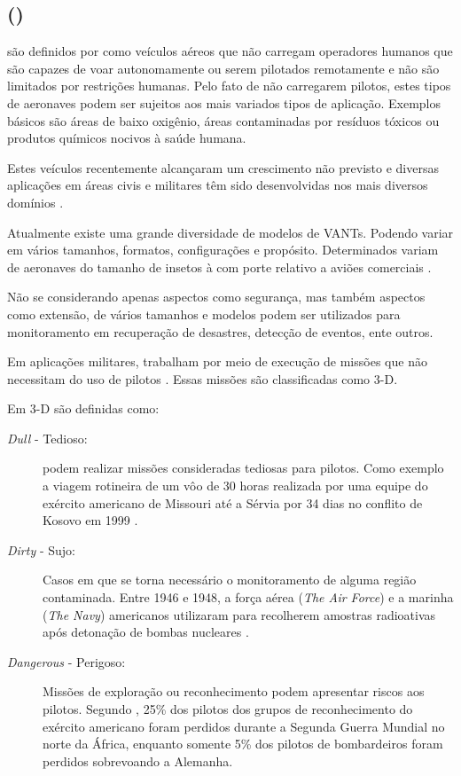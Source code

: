 \subsection{\uavs (\vants) }

\vants são definidos por \cite{uav_roadmap2005} como veículos aéreos que não carregam operadores humanos que são capazes de voar autonomamente ou serem pilotados remotamente e não são limitados por restrições humanas. Pelo fato de não carregarem pilotos, estes tipos de aeronaves podem ser sujeitos aos mais variados tipos de aplicação.
Exemplos básicos são áreas de baixo oxigênio, áreas contaminadas por resíduos tóxicos ou produtos químicos nocivos à saúde humana.

Estes veículos recentemente alcançaram um crescimento não previsto e diversas aplicações em áreas civis e militares têm sido desenvolvidas nos mais diversos domínios \cite{Valavanis2007}.


Atualmente existe uma grande diversidade de modelos de VANTs. Podendo variar em vários tamanhos, formatos, configurações e propósito.
Determinados \vants variam de aeronaves do tamanho de insetos à \vants com porte relativo a aviões comerciais \cite{Bone2003}.

Não se considerando apenas aspectos como segurança, mas também aspectos como extensão, \vants de vários tamanhos e modelos podem ser utilizados para monitoramento em recuperação de desastres, detecção de eventos, ente outros. 

Em aplicações militares, \vants trabalham por meio de execução de missões que não necessitam do uso de pilotos \cite{Bone2003}. Essas missões são classificadas como 3-D.


Em \cite{uav_roadmap2005} 3-D são definidas como:
\begin{description}
\item[\emph{Dull} - Tedioso: ]
\vants podem realizar missões consideradas tediosas para pilotos. Como exemplo a viagem rotineira de um vôo de 30 horas realizada por uma equipe do exército americano de Missouri até a Sérvia por 34 dias no conflito de Kosovo em 1999 \cite{uav_roadmap2005}. 

\item[\emph{Dirty} - Sujo: ]
Casos em que se torna necessário o monitoramento de alguma região contaminada. Entre 1946 e 1948, a força aérea (\emph{The Air Force}) e a marinha (\emph{The Navy}) americanos utilizaram \vants para recolherem amostras radioativas após detonação de bombas nucleares \cite{uav_roadmap2005}.

\item[\emph{Dangerous} - Perigoso: ]
Missões de exploração ou reconhecimento podem apresentar riscos aos pilotos. Segundo \cite{uav_roadmap2005}, 25\%  dos pilotos dos grupos de reconhecimento do exército americano foram perdidos durante a Segunda Guerra Mundial no norte da África, enquanto somente 5\% dos pilotos de bombardeiros foram perdidos sobrevoando a Alemanha.

\end{description}

